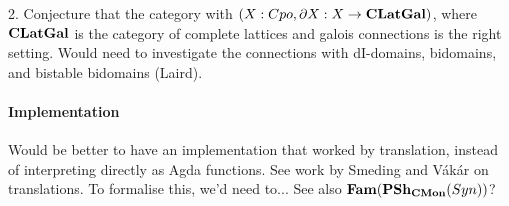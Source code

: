 2. Conjecture that the category with $(X : Cpo, \partial X : X \to \mathbf{CLatGal})$, where $\mathbf{CLatGal}$ is the category of complete lattices and galois connections is the right setting. Would need to investigate the connections with dI-domains, bidomains, and bistable bidomains (Laird).

\paragraph{Implementation}

Would be better to have an implementation that worked by translation,
instead of interpreting directly as Agda functions. See work by
Smeding and Vákár on translations. To formalise this, we'd need
to... See also $\mathbf{Fam}(\mathbf{PSh}_{\mathbf{CMon}}(Syn))$?
